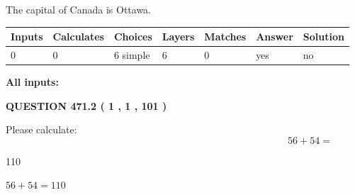 \documentclass[12pt]{article}
\begin{document}
 
\noindent{}
 
 
The capital of Canada is Ottawa.
 
 
\noindent{}
 
 
   
   
   
   
\noindent\begin{tabular}{|l|l|l|l|l|l|l|}
 \hline
Inputs & Calculates & Choices & Layers & Matches & Answer & Solution \\ \hline
 0  & 
 0  & 
 6
  simple  
  & 
 6  & 
 0  & 
  yes & 
  no 
  \\ \hline
 \end{tabular}
   
   
   
   
\noindent{}
   
   
   
   
\noindent\vspace{0.1in}\hspace{-0.08in} {\textbf{\Large{All inputs: }}}
   
   
  
\vspace{0.2in}
  
{\textbf{\Large{QUESTION
471.2 
 ( 1 , 1 , 101 )
}}}
  
  
 
Please calculate:
\begin{equation}
56 +  %
54 = \nonumber
\end{equation}
 
 
 
\noindent{}
 
 

110
 
 
\noindent{}
 
 

 
 
 
\noindent{}
 
 

$ %
56 +  %
54=   %
110$
 
\end{document}
